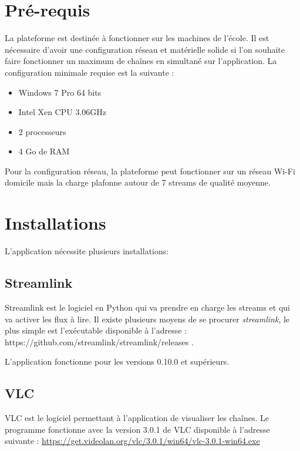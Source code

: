 \documentclass{polytech/polytech}
\begin{document}
\section{Pré-requis}


La plateforme est destinée à fonctionner sur les machines de l’école. Il est nécessaire d'avoir une configuration réseau et matérielle solide si l'on souhaite faire fonctionner un maximum de chaînes en simultané sur l'application. La configuration minimale requise est la suivante :

\begin{itemize}
	\item Windows 7 Pro 64 bits
	\item Intel Xen CPU 3.06GHz
	\item 2 processeurs
	\item 4 Go de RAM
\end{itemize}


Pour la configuration réseau, la plateforme peut fonctionner sur un réseau Wi-Fi domicile mais la charge plafonne autour de 7 streams de qualité moyenne.


\section{Installations}

L'application nécessite plusieurs installations:

\subsection{Streamlink}

Streamlink est le logiciel en Python qui va prendre en charge les streams et qui va activer les flux à lire. Il existe plusieurs moyens de se procurer \textit{streamlink}, le plus simple est l'exécutable disponible à l'adresse : https://github.com/streamlink/streamlink/releases .

L'application fonctionne pour les versions 0.10.0 et supérieurs.

\subsection{VLC}

VLC est le logiciel permettant à l'application de visualiser les chaînes. Le programme  fonctionne avec la version 3.0.1 de VLC disponible à l'adresse suivante : \url{https://get.videolan.org/vlc/3.0.1/win64/vlc-3.0.1-win64.exe}
\end{document}

